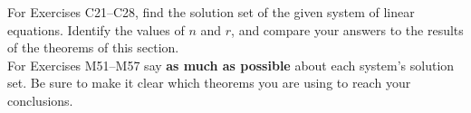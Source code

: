 %
%
%
%
%
For Exercises C21--C28, find the solution set of the given system of linear equations. Identify the values of $n$ and $r$, and compare your answers to the results of the theorems of this section.\\
%
For Exercises M51--M57  say {\bf as much as possible} about each system's solution set.  Be sure to make it clear which theorems you are using to reach your conclusions.\\
%
%
